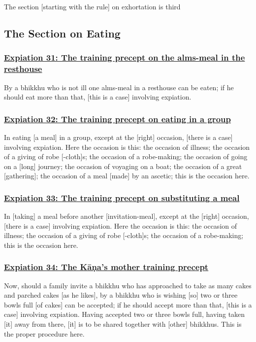 \begin{center}
  The section [starting with the rule] on exhortation is third
\end{center}

\setsubsecheadstyle{\subsectionFmt}
\subsection{The Section on Eating}
\vspace{0.2cm}

\subsubsection*{\hyperref[pac31]{Expiation 31: The training precept on the alms-meal in the resthouse}}
\label{exp31}
By a bhikkhu who is not ill one alms-meal in a resthouse can be eaten; if he should eat more than that, [this is a case] involving expiation.

\subsubsection*{\hyperref[pac32]{Expiation 32: The training precept on eating in a group}}
\label{exp32}
In eating [a meal] in a group, except at the [right] occasion, [there is a case] involving expiation. Here the occasion is this: the occasion of illness; the occasion of a giving of robe [-cloth]s; the occasion of a robe-making; the occasion of going on a [long] journey; the occasion of voyaging on a boat; the occasion of a great [gathering]; the occasion of a meal [made] by an ascetic; this is the occasion here.

\subsubsection*{\hyperref[pac33]{Expiation 33: The training precept on substituting a meal}}
\label{exp33}
In [taking] a meal before another [invitation-meal], except at the [right] occasion, [there is a case] involving expiation. Here the occasion is this: the occasion of illness; the occasion of a giving of robe [-cloth]s; the occasion of a robe-making; this is the occasion here.

\subsubsection*{\hyperref[pac34]{Expiation 34: The Kāṇa's mother training precept}}
\label{exp34}
Now, should a family invite a bhikkhu who has approached to take as many cakes and parched cakes [as he likes], by a bhikkhu who is wishing [so] two or three bowls full [of cakes] can be accepted; if he should accept more than that, [this is a case] involving expiation. Having accepted two or three bowls full, having taken [it] away from there, [it] is to be shared together with [other] bhikkhus. This is the proper procedure here.

